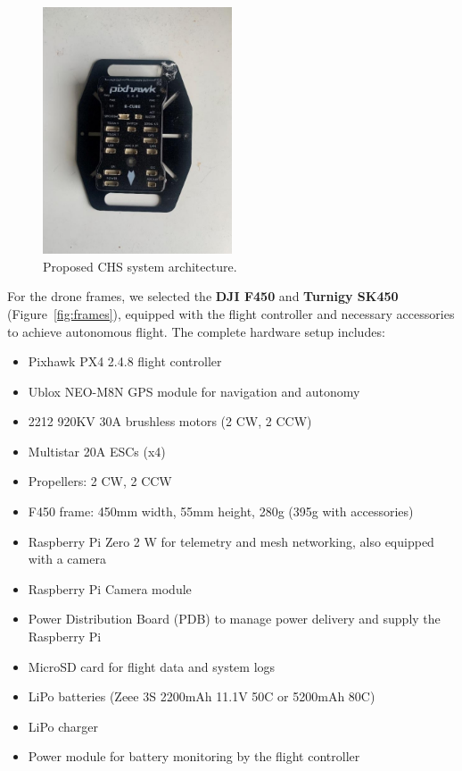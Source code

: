 \begin{figure}[H]  
    \centering
    \includegraphics[width=0.5\textwidth]{Figures/Chapter5/Section2/pixhawk.png} %
    \caption{Proposed CHS system architecture.}
    \label{fig:proposed_architecture} %
\end{figure}


For the drone frames, we selected the \textbf{DJI F450} and \textbf{Turnigy SK450} (Figure~\ref{fig:frames}), 
equipped with the flight controller and necessary accessories to achieve autonomous flight.  
The complete hardware setup includes:  

\begin{itemize}
    \item Pixhawk PX4 2.4.8 flight controller  
    \item Ublox NEO-M8N GPS module for navigation and autonomy  
    \item 2212 920KV 30A brushless motors (2 CW, 2 CCW)  
    \item Multistar 20A ESCs (x4)  
    \item Propellers: 2 CW, 2 CCW  
    \item F450 frame: 450mm width, 55mm height, 280g (395g with accessories)  
    \item Raspberry Pi Zero 2 W for telemetry and mesh networking, also equipped with a camera  
    \item Raspberry Pi Camera module  
    \item Power Distribution Board (PDB) to manage power delivery and supply the Raspberry Pi  
    \item MicroSD card for flight data and system logs  
    \item LiPo batteries (Zeee 3S 2200mAh 11.1V 50C or 5200mAh 80C)  
    \item LiPo charger  
    \item Power module for battery monitoring by the flight controller  
\end{itemize}

